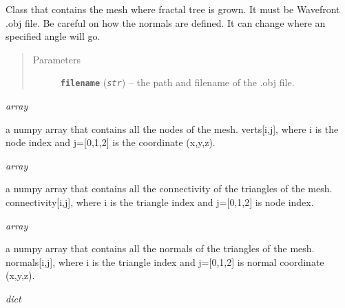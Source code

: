 \documentclass[letterpaper,10pt,english]{sphinxmanual}
\begin{document}
\begin{fulllineitems}
\label{mesh:mesh.Mesh}
Class that contains the mesh where fractal tree is grown. It must be Wavefront .obj file. Be careful on how the normals are defined. It can change where an specified angle will go.
\begin{quote}\begin{description}
\item[{Parameters}] \leavevmode
\textbf{\texttt{filename}} (\emph{\texttt{str}}) -- the path and filename of the .obj file.

\end{description}\end{quote}

\begin{fulllineitems}
\label{mesh:mesh.Mesh.verts}
\emph{array}

a numpy array that contains all the nodes of the mesh. verts{[}i,j{]}, where i is the node index and j={[}0,1,2{]} is the coordinate (x,y,z).

\end{fulllineitems}


\begin{fulllineitems}
\label{mesh:mesh.Mesh.connectivity}
\emph{array}

a numpy array that contains all the connectivity of the triangles of the mesh. connectivity{[}i,j{]}, where i is the triangle index and j={[}0,1,2{]} is node index.

\end{fulllineitems}


\begin{fulllineitems}
\label{mesh:mesh.Mesh.normals}
\emph{array}

a numpy array that contains all the normals of the triangles of the mesh. normals{[}i,j{]}, where i is the triangle index and j={[}0,1,2{]} is normal coordinate (x,y,z).

\end{fulllineitems}


\begin{fulllineitems}
\label{mesh:mesh.Mesh.node_to_tri}
\emph{dict}


\end{fulllineitems}
\end{fulllineitems}
\end{document}
